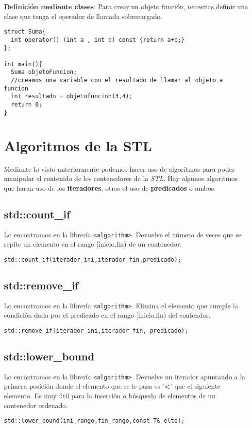 \textbf{Definición mediante clases}: Para crear un objeto función, necesitas definir una clase que tenga el operador de llamada sobrecargado.
\begin{center}
	\begin{lstlisting}[frame=single]
struct Suma{
  int operator() (int a , int b) const {return a+b;}
};

int main(){
  Suma objetoFuncion;
  //creamos una variable con el resultado de llamar al objeto a funcion
  int resultado = objetofuncion(3,4);
  return 0;
}
	\end{lstlisting}
\end{center}

\section{Algoritmos de la STL}
Mediante lo visto anteriormente podemos hacer uso de algoritmos para poder manipular el contenido de los contenedores de la \textit{STL}.
Hay algunos algoritmos que haran uso de los \textbf{iteradores}, otros el uso de \textbf{predicados} o ambos.

\subsection{std::count\_if}
Lo encontramos en la librería \texttt{\textless algorithm\textgreater}.
Devuelve el número de veces que se repite un elemento en el rango [inicio,fin) de un contenedor.
\begin{center}
	\texttt{std::count\_if(iterador\_ini,iterador\_fin,predicado);}
\end{center}

\subsection{std::remove\_if}
Lo encontramos en la librería \texttt{\textless algorithm\textgreater}.
Elimina el elemento que cumple la condición dada por el predicado en el rango [inicio,fin) del contendor.
\begin{center}
	\texttt{std::remove\_if(iterador\_ini,iterador\_fin, predicado);}
\end{center}

\subsection{std::lower\_bound}
Lo encontramos en la librería \texttt{\textless algorithm\textgreater}.
Devuelve un iterador apuntando a la primera posición donde el elemento que se le pasa es '\textbf{\textless}' que el siguiente elemento.
Es muy útil para la inserción o búsqueda de elementos de un contenedor ordenado.
\begin{center}
	\texttt{std::lower\_bound(ini\_rango,fin\_rango,const T\& elto);}
\end{center}

